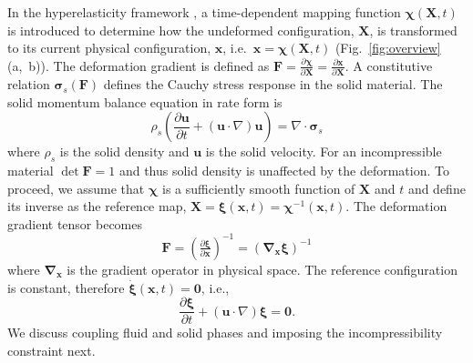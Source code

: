 \documentclass[times, 10pt]{article}
\renewcommand{\vec}[1]{\mathbf{#1}}
\newcommand{\vu}{\vec{u}}
\newcommand{\vx}{\vec{x}}
\newcommand{\vX}{\vec{X}}
\newcommand{\vF}{\vec{F}}
\newcommand{\vxi}{\boldsymbol\xi}
\newcommand{\vsigma}{\boldsymbol\sigma}
\newcommand{\vchi}{\boldsymbol\chi}
\begin{document}
\begin{multicols}{2}
In the hyperelasticity framework \cite{gurtin10}, a time-dependent mapping function $ \vchi (\vX, t)$
is introduced to determine how
the undeformed configuration, $\vX$,
is transformed to its current physical configuration, $\vx$, i.e.~$\vx =  \vchi(\vX, t)$ (Fig.~\ref{fig:overview}(a,~b)).
The deformation gradient is defined as $\vF = \tfrac{\partial  \vchi}{\partial \vX} = \tfrac{\partial \vx}{\partial \vX}$.
A constitutive relation $ \vsigma_s (\vF)$ defines the Cauchy stress response in the solid material.
The solid momentum balance equation in rate form is
%
\begin{equation}
\label{eq:solid_mmt}
\rho_s \left (\frac{\partial \vu}{\partial t}
 + ( \vu \cdot \nabla ) \vu \right) = \nabla \cdot \vsigma_s
 \end{equation}
where $\rho_s$ is the solid density and $\vu$ is the solid velocity.
For an incompressible material $\det \vF = 1$ and thus solid density is unaffected by the deformation.
%
To proceed, we assume that $\vchi$ is a sufficiently smooth function of $\vX$ and $t$ and define its inverse as the reference map, $ \vX = \vxi (\vx, t) = \vchi^{-1} (\vx, t)$.
The deformation gradient tensor becomes
%
\begin{equation}
\label{eq:def_grad}
\vF = \left(\tfrac{\partial \vxi}{\partial \vx}\right)^{-1} = \left( \mathbf \nabla_{\vx}  \vxi \right)^{-1}
\end{equation}
%
where $\mathbf \nabla_{\vx}$ is the gradient operator in physical space.
The reference configuration is constant, therefore $\dot{\vxi} (\vx,t) = \vec{0}$, i.e.,
%
\begin{equation}
\frac{\partial  \vxi}{\partial t} + (\vu \cdot \nabla)  \vxi = \vec{0}.
\label{eq:xi_adv}
\end{equation}
%
We discuss coupling fluid and solid phases and imposing the incompressibility constraint next.

%

\end{multicols}
\end{document}
